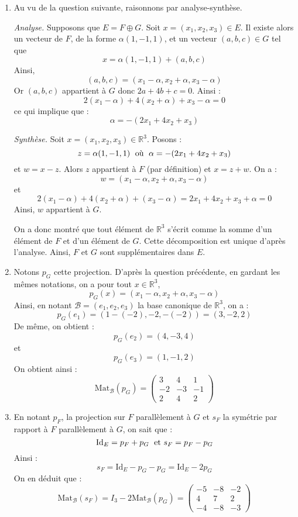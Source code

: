 \documentclass[a4paper,10pt]{report}
\begin{document}
\begin{enumerate}
\item Au vu de la question suivante, raisonnons par analyse-synthèse.

\medskip

\noindent \textit{Analyse.} Supposons que $E = F \oplus G$. Soit $x=(x_1,x_2,x_3) \in E$. Il existe alors un vecteur de $F$, de la forme $\alpha (1,-1,1)$, et un vecteur $(a,b,c) \in G$ tel que 
$$x = \alpha (1,-1,1) + (a,b,c)$$
Ainsi,
$$ (a,b,c) = (x_1 - \alpha, x_2+\alpha, x_3- \alpha)$$
Or $(a,b,c)$ appartient à $G$ donc $2a+4b+c=0$. Ainsi :
$$ 2(x_1 -\alpha) + 4 (x_2+ \alpha) + x_3- \alpha = 0$$
ce qui implique que :
$$ \alpha = - (2x_1+4x_2+x_3)$$

\medskip

\noindent \textit{Synthèse.} Soit $x=(x_1,x_2,x_3) \in \mathbb{R}^3$. Posons :
$$ z = \alpha (1,-1,1) \; \hbox{ où } \; \alpha = - (2x_1+4x_2+x_3)$$
et $w=x-z$. Alors $z$ appartient à $F$ (par définition) et $x=z+w$. On a :
$$ w = (x_1- \alpha, x_2+ \alpha, x_3- \alpha)$$
et 
$$ 2(x_1 - \alpha) + 4(x_2+ \alpha) + (x_3-\alpha) = 2x_1+4x_2+x_3 + \alpha = 0$$
Ainsi, $w$ appartient à $G$.

\medskip

\noindent On a donc montré que tout élément de $\mathbb{R}^3$ s'écrit comme la somme d'un élément de $F$ et d'un élément de $G$. Cette décomposition est unique d'après l'analyse. Ainsi, $F$ et $G$ sont supplémentaires dans $E$.
\item Notons $p_G$ cette projection. D'après la question précédente, en gardant les mêmes notations, on a pour tout $x \in \mathbb{R}^3$,
$$ p_G(x) = (x_1- \alpha, x_2+ \alpha, x_3- \alpha)$$
Ainsi, en notant $\mathcal{B}=(e_1,e_2,e_3)$ la base canonique de $\mathbb{R}^3$, on a :
$$ p_G(e_1) =(1 - (-2), -2, -(-2)) = (3,-2,2) $$
De même, on obtient :
$$ p_G(e_2) = (4,-3, 4) $$
et 
$$ p_G(e_3) = (1, -1, 2) $$
On obtient ainsi :
$$ \textrm{Mat}_{\mathcal{B}}(p_G) =  \begin{pmatrix}
3 & 4& 1 \\
-2& -3 & -1 \\
2 & 4 & 2
\end{pmatrix}$$
\item En notant $p_F$, la projection sur $F$ parallèlement à $G$ et $s_F$ la symétrie par rapport à $F$ parallèlement à $G$, on sait que :
$$ \textrm{Id}_E = p_F+p_G \; \hbox{ et } s_F = p_F-p_G$$
Ainsi :
$$ s_F = \textrm{Id}_E- p_G-p_G = \textrm{Id}_E - 2p_G$$
On en déduit que :
$$ \textrm{Mat}_{\mathcal{B}}(s_F) = I_3 - 2 \textrm{Mat}_{\mathcal{B}}(p_G) =  \begin{pmatrix}
-5 & -8& -2 \\
4& 7 & 2 \\
-4 & -8 & -3
\end{pmatrix}$$
\end{enumerate}
\end{document}
